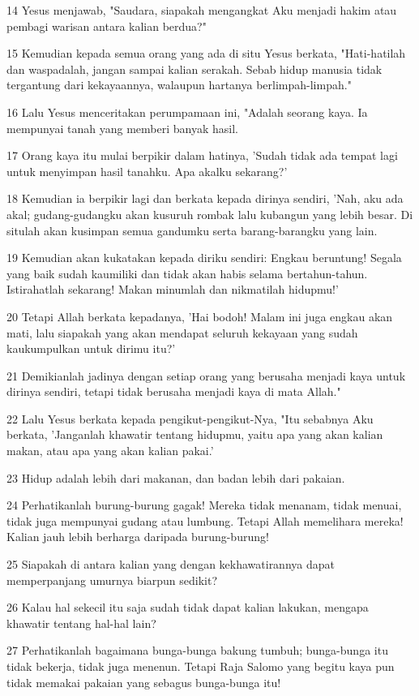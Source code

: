\par 14 Yesus menjawab, "Saudara, siapakah mengangkat Aku menjadi hakim atau pembagi warisan antara kalian berdua?"
\par 15 Kemudian kepada semua orang yang ada di situ Yesus berkata, "Hati-hatilah dan waspadalah, jangan sampai kalian serakah. Sebab hidup manusia tidak tergantung dari kekayaannya, walaupun hartanya berlimpah-limpah."
\par 16 Lalu Yesus menceritakan perumpamaan ini, "Adalah seorang kaya. Ia mempunyai tanah yang memberi banyak hasil.
\par 17 Orang kaya itu mulai berpikir dalam hatinya, 'Sudah tidak ada tempat lagi untuk menyimpan hasil tanahku. Apa akalku sekarang?'
\par 18 Kemudian ia berpikir lagi dan berkata kepada dirinya sendiri, 'Nah, aku ada akal; gudang-gudangku akan kusuruh rombak lalu kubangun yang lebih besar. Di situlah akan kusimpan semua gandumku serta barang-barangku yang lain.
\par 19 Kemudian akan kukatakan kepada diriku sendiri: Engkau beruntung! Segala yang baik sudah kaumiliki dan tidak akan habis selama bertahun-tahun. Istirahatlah sekarang! Makan minumlah dan nikmatilah hidupmu!'
\par 20 Tetapi Allah berkata kepadanya, 'Hai bodoh! Malam ini juga engkau akan mati, lalu siapakah yang akan mendapat seluruh kekayaan yang sudah kaukumpulkan untuk dirimu itu?'
\par 21 Demikianlah jadinya dengan setiap orang yang berusaha menjadi kaya untuk dirinya sendiri, tetapi tidak berusaha menjadi kaya di mata Allah."
\par 22 Lalu Yesus berkata kepada pengikut-pengikut-Nya, "Itu sebabnya Aku berkata, 'Janganlah khawatir tentang hidupmu, yaitu apa yang akan kalian makan, atau apa yang akan kalian pakai.'
\par 23 Hidup adalah lebih dari makanan, dan badan lebih dari pakaian.
\par 24 Perhatikanlah burung-burung gagak! Mereka tidak menanam, tidak menuai, tidak juga mempunyai gudang atau lumbung. Tetapi Allah memelihara mereka! Kalian jauh lebih berharga daripada burung-burung!
\par 25 Siapakah di antara kalian yang dengan kekhawatirannya dapat memperpanjang umurnya biarpun sedikit?
\par 26 Kalau hal sekecil itu saja sudah tidak dapat kalian lakukan, mengapa khawatir tentang hal-hal lain?
\par 27 Perhatikanlah bagaimana bunga-bunga bakung tumbuh; bunga-bunga itu tidak bekerja, tidak juga menenun. Tetapi Raja Salomo yang begitu kaya pun tidak memakai pakaian yang sebagus bunga-bunga itu!
